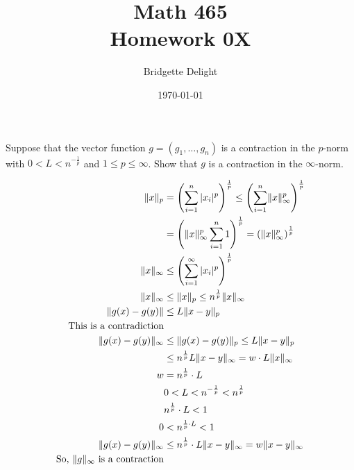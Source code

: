 \documentclass{article}
\title{{\large Math 465}\\ Homework 0X}
\author{Bridgette Delight}
\date{\today}
\DeclarePairedDelimiter{\norm}{\lVert}{\rVert}
\begin{document}

\section{}
Suppose that the vector function $g=(g_1, \dots, g_n)$ is a contraction in the $p$-norm with $0<L<n^{-\frac{1}{p}}$ and $1 \le p \le \infty$. Show that $g$ is a contraction in the $\infty$-norm.

\begin{align*}
    \norm{x}_{p} &= \left( \sum_{i=1}^n |x_i|^p \right)^{\frac{1}{p}} \le \left( \sum_{i=1}^n\norm{x}_{\infty}^p \right)^{\frac{1}{p}} \\
    &= \left(\norm{x}_{\infty}^p \sum_{i=1}^n  1 \right)^{\frac{1}{p}}= \left( \norm{x}_{\infty}^p  \right)^{\frac{1}{p}}\\
    \norm{x}_{\infty} &\le  \left( \sum_{i=1}^{\infty} | x_i |^p \right)^{\frac{1}{p}} \\
    \norm{x}_{\infty}& \le  \norm{x}_{p} \le n^{\frac{1}{p}} \norm{x}_{\infty}\\
    \norm{g(x)- g(y)} & \le L \norm{x-y}_p \\
    \text{This is a contradiction}&\\
    \norm{g(x)- g(y)}_{\infty} & \le \norm{g(x)-g(y)}_p \le L \norm{x-y}_p \\
    &\le n^{\frac{1}{p}} L \norm{x-y}_{\infty} = w\cdot L \norm{x}_{\infty}\\
    w &= n^{\frac{1}{p}} \cdot L \\
    &0 < L < n^{-\frac{1}{p}}<n^{\frac{1}{p}}\\
    &n^{\frac{1}{p}} \cdot L < 1\\
    0 &< n^{\frac{1}{p}\cdot L}<1\\
    \norm{g(x) - g(y)}_{\infty} & \le n^{\frac{1}{p}} \cdot L \norm{x - y}_{\infty}= w \norm{ x - y }_{\infty} \\
    \text{So, $\norm{g}_{\infty}$ is a contraction}&\\
\end{align*}
\end{document}
